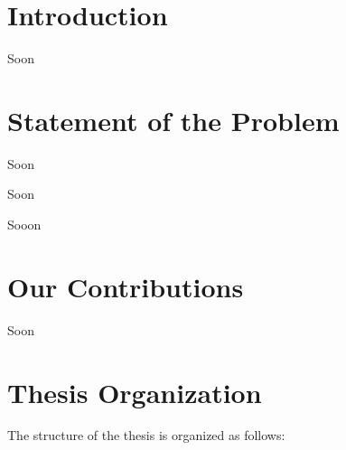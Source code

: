 \section{Introduction}\label{sec:2.1}
\vspace{-0.5cm}
\noindent Soon


\vspace{-0.3cm}


\section{Statement of the Problem}\label{sec:2.2}
\vspace{-0.5cm}
\noindent Soon

\vspace{-0.5cm}
\par
\noindent Soon

\vspace{-0.5cm}
\par
\noindent Sooon 


\vspace{-0.3cm}
\section{Our Contributions}\label{sec:2.3}
\vspace{-0.5cm}

\noindent Soon

\vspace{-0.3cm}
\section{Thesis Organization}\label{sec:2.4}
\vspace{-0.5cm}
\noindent The structure of the thesis is organized as follows:

